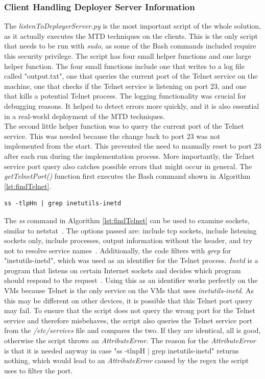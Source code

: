 \subsubsection{Client Handling Deployer Server Information}
The \textit{listenToDeployerServer.py} is the most important script of the whole solution, as it actually executes the MTD techniques on the clients. This is the only script that needs to be run with \textit{sudo}, as some of the Bash commands included require this security privilege. 
The script has four small helper functions and one large helper function. The four small functions include one that writes to a log file called "output.txt", one that queries the current port of the Telnet service on the machine, one that checks if the Telnet service is listening on port 23, and one that kills a potential Telnet process. The logging functionality was crucial for debugging reasons. It helped to detect errors more quickly, and it is also essential in a real-world deployment of the MTD techniques. 
\\

The second little helper function was to query the current port of the Telnet service. This was needed because the change back to port 23 was not implemented from the start. This prevented the need to manually reset to port 23 after each run during the implementation process. More importantly, the Telnet service port query also catches possible errors that might occur in general. The \textit{getTelnetPort()} function first executes the Bash command shown in Algorithm \ref{lst:findTelnet}.

 \begin{lstlisting}[caption={The Bash Command Used to Query the Telnet Service Port.},label= {lst:findTelnet}]
ss -tlpHn | grep inetutils-inetd
\end{lstlisting}

The \textit{ss} command in Algorithm \ref{lst:findTelnet} can be used to examine sockets, similar to netstat~\cite{website:ss}. The options passed are: include tcp sockets, include listening sockets only, include processes, output information without the header, and try not to resolve service names~\cite{website:ss}. Additionally, the code filters with \textit{grep} for "inetutils-inetd", which was used as an identifier for the Telnet process. \textit{Inetd} is a program that listens on certain Internet sockets and decides which program should respond to the request~\cite{website:inet}. Using this as an identifier works perfectly on the VMs because Telnet is the only service on the VMs that uses \textit{inetutils-inetd}. As this may be different on other devices, it is possible that this Telnet port query may fail. To ensure that the script does not query the wrong port for the Telnet service and therefore misbehaves, the script also queries the Telnet service port from the \textit{/etc/services} file and compares the two. If they are identical, all is good, otherwise the script throws an \textit{AttributeError}. The reason for the \textit{AttributeError} is that it is needed anyway in case "ss -tlnpH | grep inetutils-inetd" returns nothing, which would lead to an \textit{AttributeError} caused by the regex the script uses to filter the port.

